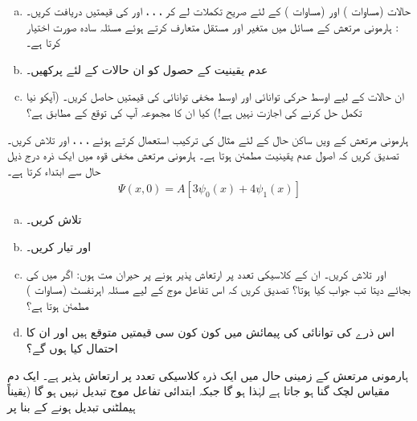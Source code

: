 %
\begin{enumerate}[a.]
\item
حالات  (مساوات ) اور  (مساوات ) کے لئے صریح تکملات لے کر ، ، ، اور  کی قیمتیں دریافت کریں۔ : ہارمونی مرتعش کے مسائل میں متغیر  اور مستقل 
 متعارف کرتے ہوئے مسئلہ سادہ صورت اختیار کرتا ہے۔
\item
عدم یقینیت کے حصول کو ان حالات کے لئے پرکھیں۔
\item
ان حالات کے لیے اوسط حرکی توانائی اور اوسط مخفی توانائی  کی قیمتیں حاصل کریں۔ (آپکو نیا تکمل حل کرنے کی اجازت نہیں ہے!) کیا ان کا مجموعہ آپ کی توقع کے مطابق ہے؟
\end{enumerate}
%
ہارمونی مرتعش کے  ویں ساکن حال کے لئے مثال 
کی ترکیب استعمال کرتے ہوئے ، ، ،  اور  تلاش کریں۔ تصدیق کریں کہ اصول عدم یقینیت مطمئن ہوتا ہے۔
%
ہارمونی مرتعش مخفی قوہ میں ایک ذرہ درج ذیل حال سے ابتداء کرتا ہے۔
\begin{align*}
\Psi(x,0)=A[3\psi_{0}(x)+4\psi_{1}(x)]
\end{align*}
\begin{enumerate}[a.]
\item
{} تلاش کریں۔
\item
{} اور  تیار کریں۔
\item
{} اور  تلاش کریں۔ ان کے کلاسیکی تعدد پر ارتعاش پذیر ہونے پر حیران مت ہوں: اگر میں  کی بجائے  دیتا تب جواب کیا ہوتا؟ تصدیق کریں کہ اس تفاعل موج کے لیے مسئلہ اہرنفسٹ (مساوات ) مطمئن ہوتا ہے؟
\item
اس ذرے کی توانائی کی پیمائش میں کون کون سی قیمتیں متوقع ہیں اور ان کا احتمال کیا ہوں گے؟
\end{enumerate}
%
ہارمونی مرتعش کے زمینی حال میں ایک ذرہ کلاسیکی تعدد  پر ارتعاش پذیر ہے۔ ایک دم مقیاس لچک  گنا ہو جاتا ہے لہٰذا  ہو گا جبکہ ابتدائی تفاعل موج تبدیل نہیں ہو گا (یقیناً ہیملٹنی تبدیل ہونے کے بنا پر 
